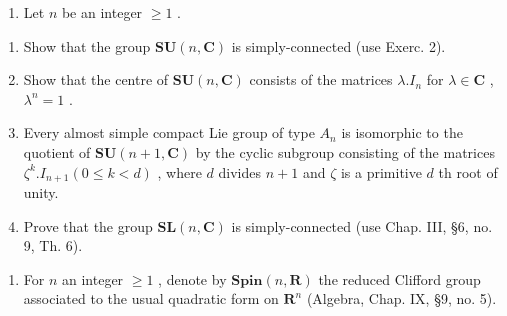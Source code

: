 \begin{enumerate}
\def\labelenumi{\arabic{enumi})}
\setcounter{enumi}{3}
\tightlist
\item
  Let \(n\) be an integer \(\geq 1\) .
\end{enumerate}

\begin{enumerate}
\def\labelenumi{\alph{enumi})}
\item
  Show that the group \(\mathbf{SU}(n,\mathbf{C})\) is simply-connected (use Exerc. 2).
\item
  Show that the centre of \(\mathbf{SU}(n,\mathbf{C})\) consists of the matrices \(\lambda .I_n\) for \(\lambda \in \mathbf{C}\) , \(\lambda^n = 1\) .
\item
  Every almost simple compact Lie group of type \(A_{n}\) is isomorphic to the quotient of \(\mathbf{SU}(n+1,\mathbf{C})\) by the cyclic subgroup consisting of the matrices \(\zeta^k. I_{n+1} (0 \leq k < d)\) , where \(d\) divides \(n + 1\) and \(\zeta\) is a primitive \(d\) th root of unity.
\item
  Prove that the group \(\mathbf{SL}(n,\mathbf{C})\) is simply-connected (use Chap. III, §6, no. 9, Th. 6).
\end{enumerate}

\begin{enumerate}
\def\labelenumi{\arabic{enumi})}
\setcounter{enumi}{4}
\tightlist
\item
  For \(n\) an integer \(\geq 1\) , denote by \(\mathbf{Spin}(n, \mathbf{R})\) the reduced Clifford group associated to the usual quadratic form on \(\mathbf{R}^n\) (Algebra, Chap. IX, §9, no. 5).
\end{enumerate}

